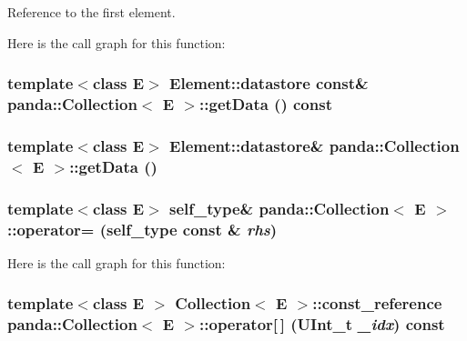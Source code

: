 Reference to the first element. 

Here is the call graph for this function:\hypertarget{classpanda_1_1Collection_ab27df679acedc97ee31d230dd630cccf}{
\subsubsection[{getData}]{\setlength{\rightskip}{0pt plus 5cm}template$<$class E$>$ {\bf Element::datastore} const\& {\bf panda::Collection}$<$ E $>$::getData () const}}
\label{classpanda_1_1Collection_ab27df679acedc97ee31d230dd630cccf}
\hypertarget{classpanda_1_1Collection_a262ac9c1180f647b0140e53fe0e5d5d6}{
\subsubsection[{getData}]{\setlength{\rightskip}{0pt plus 5cm}template$<$class E$>$ {\bf Element::datastore}\& {\bf panda::Collection}$<$ E $>$::getData ()}}
\label{classpanda_1_1Collection_a262ac9c1180f647b0140e53fe0e5d5d6}
\hypertarget{classpanda_1_1Collection_af2065fa6ed20c1fe1dd54b33f83e7778}{
\subsubsection[{operator=}]{\setlength{\rightskip}{0pt plus 5cm}template$<$class E$>$ {\bf self\_\-type}\& {\bf panda::Collection}$<$ E $>$::operator= ({\bf self\_\-type} const \& {\em rhs})}}
\label{classpanda_1_1Collection_af2065fa6ed20c1fe1dd54b33f83e7778}


Here is the call graph for this function:\hypertarget{classpanda_1_1Collection_acc5f2873f1e8d2def48a5f0ed17a56e0}{
\subsubsection[{operator[]}]{\setlength{\rightskip}{0pt plus 5cm}template$<$class E $>$ {\bf Collection}$<$ E $>$::{\bf const\_\-reference} {\bf panda::Collection}$<$ E $>$::operator\mbox{[}$\,$\mbox{]} (UInt\_\-t {\em \_\-idx}) const}}
\label{classpanda_1_1Collection_acc5f2873f1e8d2def48a5f0ed17a56e0}


